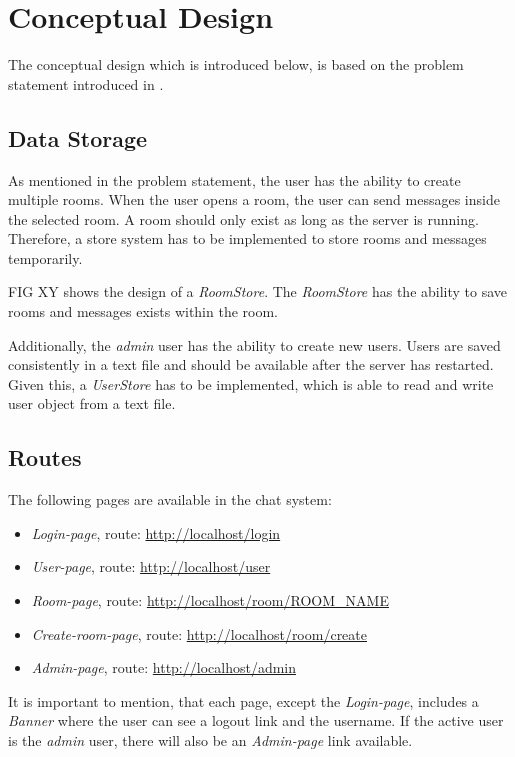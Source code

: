 \section{Conceptual Design}\label{sec:02_design}
The conceptual design which is introduced below, is based on the problem statement introduced in .


\subsection{Data Storage}\label{subsec:02_design_datastorage}
As mentioned in the problem statement, the user has the ability to create multiple rooms. When the user opens a room, the user can send messages inside the selected room. A room should only exist as long as the server is running. Therefore, a store system has to be implemented to store rooms and messages temporarily.

FIG XY shows the design of a \textit{RoomStore}. The \textit{RoomStore} has the ability to save rooms and messages exists within the room.


Additionally, the \textit{admin} user has the ability to create new users. Users are saved consistently in a text file and should be available after the server has restarted.
Given this, a \textit{UserStore} has to be implemented, which is able to read and write user object from a text file.


\subsection{Routes}\label{subsec:02_design_routes}
The following pages are available in the chat system:
\begin{itemize}
\item \textit{Login-page}, route: \url{http://localhost/login}
\item \textit{User-page}, route: \url{http://localhost/user}
\item \textit{Room-page}, route: \url{http://localhost/room/ROOM_NAME}
\item \textit{Create-room-page}, route: \url{http://localhost/room/create}
\item \textit{Admin-page}, route: \url{http://localhost/admin}
\end{itemize}

It is important to mention, that each page, except the \textit{Login-page}, includes a \textit{Banner} where the user can see a logout link and the username. If the active user is the \textit{admin} user, there will also be an \textit{Admin-page} link available.

